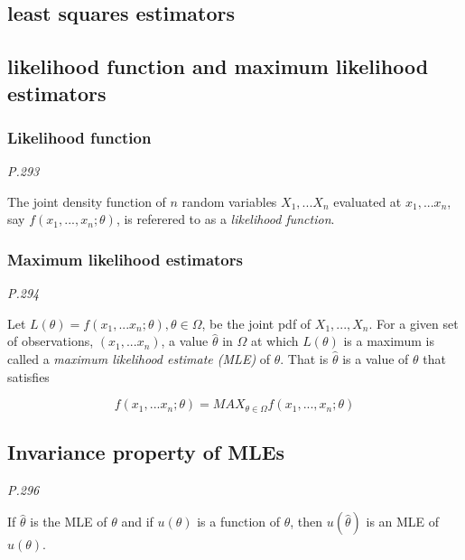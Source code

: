 \documentclass[]{book}
\begin{document}
\hypertarget{least-squares-estimators}{%
\subsection{least squares estimators}\label{least-squares-estimators}}

\hypertarget{likelihood-function-and-maximum-likelihood-estimators}{%
\subsection{likelihood function and maximum likelihood estimators}\label{likelihood-function-and-maximum-likelihood-estimators}}

\hypertarget{likelihood-function}{%
\subsubsection{Likelihood function}\label{likelihood-function}}

\emph{P.293}

The joint density function of \(n\) random variables \(X_1,...X_n\) evaluated at \(x_1, ...x_n\), say \(f(x_1,...,x_n; \theta)\), is referered to as a \emph{likelihood function}.

\hypertarget{maximum-likelihood-estimators}{%
\subsubsection{Maximum likelihood estimators}\label{maximum-likelihood-estimators}}

\emph{P.294}

Let \(L(\theta)=f(x_1,...x_n; \theta), \theta \in \Omega\), be the joint pdf of \(X_1, ..., X_n\). For a given set of observations, \((x_1,...x_n)\), a value \(\hat{\theta}\) in \(\Omega\) at which \(L(\theta)\) is a maximum is called a \emph{maximum likelihood estimate (MLE)} of \(\theta\). That is \(\hat{\theta}\) is a value of \(\theta\) that satisfies

\[f(x_1,...x_n; \theta)=MAX_{\theta \in \Omega} f(x_1, ..., x_n; \theta)\]

\hypertarget{invariance-property-of-mles}{%
\subsection{Invariance property of MLEs}\label{invariance-property-of-mles}}

\emph{P.296}

If \(\hat{\theta}\) is the MLE of \(\theta\) and if \(u(\theta)\) is a function of \(\theta\), then \(u(\hat{\theta})\) is an MLE of \(u(\theta)\).
\end{document}
